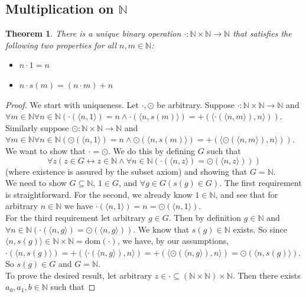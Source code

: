\documentclass{report}
\newtheorem{theorem}[theo]{Theorem}
\begin{document}
\subsection{Multiplication on $\mathbb N$}
\begin{theorem}
There is a unique binary operation $\cdot:\mathbb N\times\mathbb N\to\mathbb N$ that satisfies the following two properties for all $n,m\in\mathbb N$:
\begin{itemize}
\item $n\cdot1=n$
\item $n\cdot s(m)=(n\cdot m)+n$
\end{itemize}
\end{theorem}
\begin{proof} We start with uniqueness.
Let $\cdot,\odot$ be arbitrary. Suppose $\cdot:\mathbb N\times\mathbb N\to\mathbb N$ and 
$\forall m\in\mathbb N\forall n\in\mathbb N(\cdot(\langle n,1\rangle)=n\land\cdot(\langle n,s(m)\rangle)=+(\langle\cdot(\langle n,m\rangle),n\rangle))$. Similarly suppose 
$\odot:\mathbb N\times\mathbb N\to\mathbb N$ and 
$\forall m\in\mathbb N\forall n\in\mathbb N(\odot(\langle n,1\rangle)=n\land\odot(\langle n,s(m)\rangle)=+(\langle\odot(\langle n,m\rangle),n\rangle))$.
We want to show that $\cdot=\odot$. We do this by defining $G$ such that
\begin{equation*}
\forall z(z\in G\leftrightarrow z\in\mathbb N\land\forall n\in\mathbb N(\cdot(\langle n,z\rangle)=\odot(\langle n,z\rangle)))
\end{equation*}
(where existence is assured by the subset axiom) and showing that $G=\mathbb N$.\\
\indent We need to show $G\subseteq\mathbb N$, $1\in G$, and $\forall g\in G(s(g)\in G)$.
The first requirement is straightforward. For the second, we already know $1\in\mathbb N$, and see that for arbitrary $n\in\mathbb N$ we have 
$\cdot(\langle n,1\rangle)=n=\odot(\langle n,1\rangle)$.\\
\indent For the third requirement let arbitrary $g\in G$. Then by definition $g\in\mathbb N$ and $\forall n\in\mathbb N(\cdot(\langle n,g\rangle)=\odot(\langle n,g\rangle))$.
We know that $s(g)\in\mathbb N$ exists. So since $\langle n,s(g)\rangle\in\mathbb N\times\mathbb N=\text{dom}(\cdot)$, we have, by our assumptions, 
$\cdot(\langle n,s(g)\rangle)=+(\langle\cdot(\langle n,g\rangle),n\rangle)=+(\langle\odot(\langle n,g\rangle),n\rangle)=\odot(\langle n,s(g)\rangle)$. So $s(g)\in G$ and $G=\mathbb N$.\\
\indent To prove the desired result, let arbitrary $z\in\cdot\subseteq(\mathbb N\times\mathbb N)\times\mathbb N$. Then there exists $a_0,a_1,b\in\mathbb N$ such that 

\end{proof}
\end{document}
